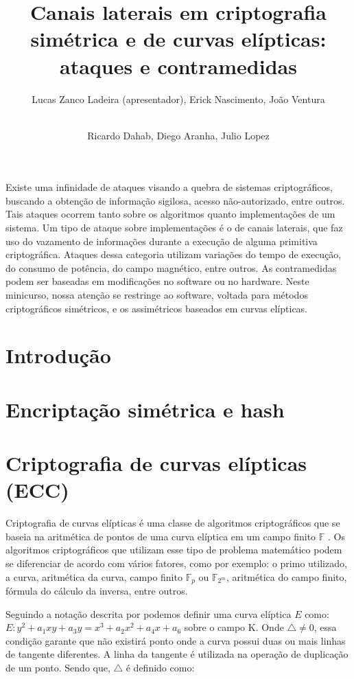 \documentclass[12pt]{article}
\title{Canais laterais em criptografia simétrica e de curvas elípticas: ataques e contramedidas}
\author{Lucas Zanco Ladeira\inst{1} (apresentador), Erick Nascimento\inst{1}, Jo\~ao Ventura\inst{1}\and \\ Ricardo Dahab\inst{1}, Diego Aranha\inst{1}, Julio Lopez\inst{1}}
\begin{document}
 

\maketitle
     
\begin{resumo}
Existe uma infinidade de ataques visando a quebra de sistemas criptogr\'aficos, buscando a obtenção de informação sigilosa, acesso não-autorizado, entre outros. Tais ataques ocorrem tanto sobre os algoritmos quanto implementações de um sistema. Um tipo de ataque sobre implementações \'e o de canais laterais, que faz uso do vazamento de informa\c{c}\~oes durante a execu\c{c}\~ao de alguma primitiva criptogr\'afica. Ataques dessa categoria utilizam variações do tempo de execução, do consumo de pot\^encia, do campo magn\'etico, entre outros. As contramedidas podem ser baseadas em modificações no software ou no hardware. Neste minicurso, nossa atenção se restringe ao software, voltada para métodos criptográficos simétricos, e os assimétricos baseados em curvas elípticas.
\end{resumo}



\section{Introdução}

\section{Encriptação simétrica e hash}

\section{Criptografia de curvas elípticas (ECC)}
Criptografia de curvas elípticas é uma classe de algoritmos criptográficos que se baseia na aritmética de pontos de uma curva elíptica em um campo finito $\mathbb{F}$ \cite{Hankerson:2003:GEC:940321}. Os algoritmos criptográficos que utilizam esse tipo de problema matemático podem se diferenciar de acordo com vários fatores, como por exemplo: o primo utilizado, a curva, aritmética da curva, campo finito $\mathbb{F}_p$ ou $\mathbb{F}_{2^m}$, aritmética do campo finito, fórmula do cálculo da inversa, entre outros.

Seguindo a notação descrita por \cite{Hankerson:2003:GEC:940321} podemos definir uma curva elíptica $E$ como: $E: y^2 + a_1xy + a_3y = x^3 + a_2x^2 + a_4x + a_6$ sobre o campo K. Onde $\bigtriangleup \neq 0$, essa condição garante que não existirá ponto onde a curva possui duas ou mais linhas de tangente diferentes. A linha da tangente é utilizada na operação de duplicação de um ponto. Sendo que, $\bigtriangleup$ é definido como:
\end{document}

